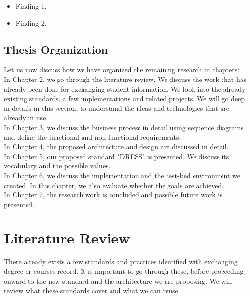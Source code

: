 \documentclass[12pt,a4paper,oneside]{book}
\begin{document}
\begin{itemize}
\item
Finding 1.
\item
Finding 2.
\end{itemize}

\section{Thesis Organization}\label{s-thesis-organization}

Let us now discuss how we have organized the remaining research in chapters: \\

In Chapter 2, we go through the literature review. We discuss the work that has already been done for exchanging student information. We look into the already existing standards, a few implementations and related projects. We will go deep in details in this section, to understand the ideas and technologies that are already in use. \\

In Chapter 3, we discuss the business process in detail using sequence diagrams and define the functional and non-functional requirements.  \\

In Chapter 4, the proposed architecture and design are discussed in detail. \\

In Chapter 5, our proposed standard "DRESS" is presented. We discuss its vocabulary and the possible values. \\

In Chapter 6, we discuss the implementation and the test-bed environment we created. In this chapter, we also evaluate whether the goals are achieved. \\

In Chapter 7, the research work is concluded and possible future work is presented.

\chapter{Literature Review}\label{ch-work}

There already exists a few standards and practices identified with exchanging degree or courses record. It is important to go through these, before proceeding onward to the new standard and the architecture we are proposing. We will review what these standards cover and what we can reuse. \\
\end{document}
